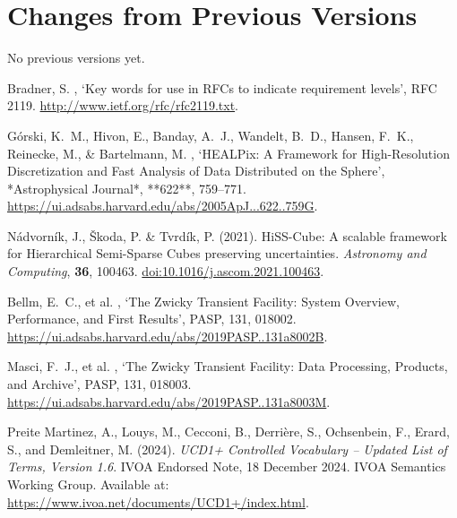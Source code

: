 \documentclass[11pt,a4paper]{ivoa}
\begin{document}
\appendix
\section{Changes from Previous Versions}
No previous versions yet.

% 
\begin{thebibliography}{}

Bradner, S.  \harvardyearright , `Key words for use in
  {RFCs} to indicate requirement levels', RFC 2119.
\newblock \url{http://www.ietf.org/rfc/rfc2119.txt}.

G{\'o}rski, K.~M., Hivon, E., Banday, A.~J., Wandelt, B.~D., Hansen, F.~K., Reinecke, M., \& Bartelmann, M.  
\harvardyearright,  
`HEALPix: A Framework for High-Resolution Discretization and Fast Analysis of Data Distributed on the Sphere',  
*Astrophysical Journal*, **622**, 759–771.  
\url{https://ui.adsabs.harvard.edu/abs/2005ApJ...622..759G}.

Nádvorník, J., Škoda, P. \& Tvrdík, P. (2021).
HiSS-Cube: A scalable framework for Hierarchical Semi-Sparse Cubes preserving uncertainties.
\textit{Astronomy and Computing}, \textbf{36}, 100463.
\href{https://doi.org/10.1016/j.ascom.2021.100463}{doi:10.1016/j.ascom.2021.100463}.

Bellm, E.~C., et al. \harvardyearright,
`The Zwicky Transient Facility: System Overview, Performance, and First Results',
PASP, 131, 018002. \url{https://ui.adsabs.harvard.edu/abs/2019PASP..131a8002B}.

Masci, F.~J., et al. \harvardyearright,
`The Zwicky Transient Facility: Data Processing, Products, and Archive',
PASP, 131, 018003. \url{https://ui.adsabs.harvard.edu/abs/2019PASP..131a8003M}.

Preite Martinez, A., Louys, M., Cecconi, B., Derrière, S., Ochsenbein, F., Erard, S., and Demleitner, M. (2024). \emph{UCD1+ Controlled Vocabulary – Updated List of Terms, Version 1.6}. IVOA Endorsed Note, 18 December 2024. IVOA Semantics Working Group. Available at: \url{https://www.ivoa.net/documents/UCD1+/index.html}.




\end{thebibliography}
\end{document}
